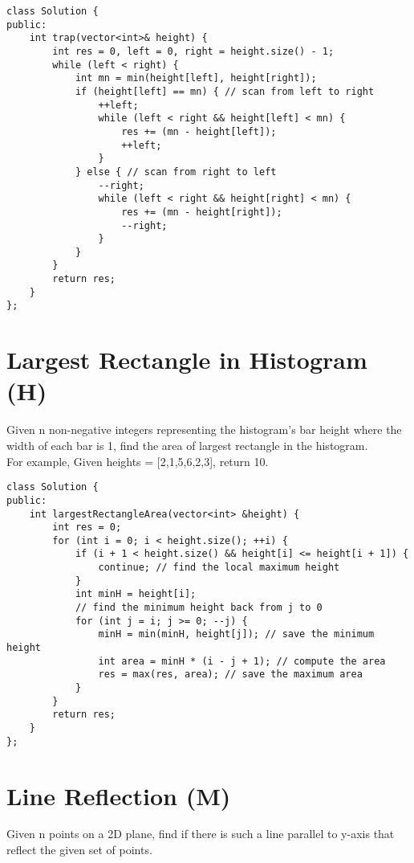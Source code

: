 \begin{lstlisting}
class Solution {
public:
    int trap(vector<int>& height) {
        int res = 0, left = 0, right = height.size() - 1;
        while (left < right) {
            int mn = min(height[left], height[right]);
            if (height[left] == mn) { // scan from left to right
                ++left;
                while (left < right && height[left] < mn) {
                    res += (mn - height[left]);
                    ++left;
                }
            } else { // scan from right to left
                --right;
                while (left < right && height[right] < mn) {
                    res += (mn - height[right]);
                    --right;
                }
            }
        }
        return res;
    }
};
\end{lstlisting}


\section{Largest Rectangle in Histogram (H)}
Given n non-negative integers representing the histogram's bar height where the width of each bar is 1, find the area of largest rectangle in the histogram. \\

For example,
Given heights = [2,1,5,6,2,3],
return 10. \\

\begin{lstlisting}
class Solution {
public:
    int largestRectangleArea(vector<int> &height) {
        int res = 0;
        for (int i = 0; i < height.size(); ++i) {
            if (i + 1 < height.size() && height[i] <= height[i + 1]) {
                continue; // find the local maximum height
            }
            int minH = height[i];
            // find the minimum height back from j to 0
            for (int j = i; j >= 0; --j) { 
                minH = min(minH, height[j]); // save the minimum height
                int area = minH * (i - j + 1); // compute the area
                res = max(res, area); // save the maximum area
            }
        }
        return res;
    }
};
\end{lstlisting}


\section{Line Reflection (M)}
Given n points on a 2D plane, find if there is such a line parallel to y-axis that reflect the given set of points.\\

